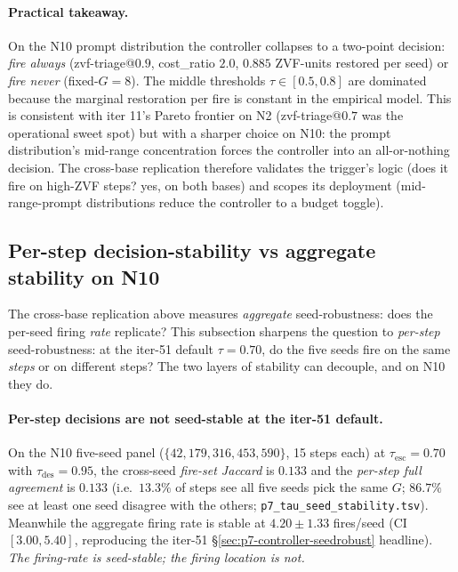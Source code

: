 \documentclass{article}
\begin{document}
\paragraph{Practical takeaway.}
On the N10 prompt distribution the controller collapses to a
two-point decision: \emph{fire always} (zvf-triage@$0.9$,
cost\_ratio $2.0$, $0.885$ ZVF-units restored per seed) or
\emph{fire never} (fixed-$G{=}8$). The middle thresholds
$\tau \in [0.5, 0.8]$ are dominated because the marginal
restoration per fire is constant in the empirical model. This
is consistent with iter 11's Pareto frontier on N2 (zvf-triage@$0.7$
was the operational sweet spot) but with a sharper choice on N10:
the prompt distribution's mid-range concentration forces the
controller into an all-or-nothing decision. The cross-base
replication therefore validates the trigger's logic (does it
fire on high-ZVF steps? yes, on both bases) and scopes its
deployment (mid-range-prompt distributions reduce the controller
to a budget toggle).

\subsection{Per-step decision-stability vs aggregate stability on N10}
\label{sec:p7-tau-decision-stability}

The cross-base replication above measures
\emph{aggregate} seed-robustness: does the per-seed firing
\emph{rate} replicate?  This subsection sharpens the
question to \emph{per-step} seed-robustness: at the iter-51
default $\tau{=}0.70$, do the five seeds fire on the same
\emph{steps} or on different steps?  The two layers of
stability can decouple, and on N10 they do.

\paragraph{Per-step decisions are not seed-stable at the
iter-51 default.}
On the N10 five-seed panel ($\{42, 179, 316, 453, 590\}$, 15
steps each) at $\tau_{\mathrm{esc}}{=}0.70$ with
$\tau_{\mathrm{des}}{=}0.95$, the cross-seed
\emph{fire-set Jaccard} is $0.133$ and the \emph{per-step
full agreement} is $0.133$ (i.e.\ $13.3\%$ of steps see all
five seeds pick the same $G$; $86.7\%$ see at least one
seed disagree with the others;
\texttt{p7\_tau\_seed\_stability.tsv}).
Meanwhile the aggregate firing rate is stable at
$4.20 \pm 1.33$ fires/seed (CI $[3.00, 5.40]$, reproducing
the iter-51 \S\ref{sec:p7-controller-seedrobust} headline).
\emph{The firing-rate is seed-stable; the firing
\emph{location} is not.}
\end{document}
